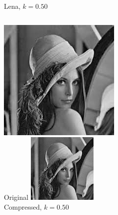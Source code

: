 \documentclass[12pt]{beamer}
\begin{document}
\begin{frame}{Lena, \(k=0.50\)}
  \begin{columns}
      \includegraphics[width=\textwidth]{Lena.jpeg}\\
      \footnotesize Original
      \includegraphics[width=\textwidth]{Lena_k50.png}\\
      \footnotesize Compressed, \(k=0.50\)
  \end{columns}
\end{frame}
\end{document}
